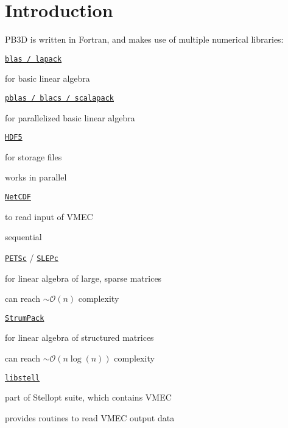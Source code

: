 \hypertarget{page_installation_installation_introduction}{}\section{Introduction}\label{page_installation_installation_introduction}
P\+B3D is written in Fortran, and makes use of multiple numerical libraries\+:
\begin{DoxyItemize}
\item \href{http://www.netlib.org/lapack/}{\tt blas / lapack}
\begin{DoxyItemize}
\item for basic linear algebra
\end{DoxyItemize}
\item \href{http://www.netlib.org/scalapack/}{\tt pblas / blacs / scalapack}
\begin{DoxyItemize}
\item for parallelized basic linear algebra
\end{DoxyItemize}
\item \href{https://www.hdfgroup.org/HDF5/}{\tt H\+D\+F5}
\begin{DoxyItemize}
\item for storage files
\item works in parallel
\end{DoxyItemize}
\item \href{https://www.unidata.ucar.edu/software/netcdf/}{\tt Net\+C\+DF}
\begin{DoxyItemize}
\item to read input of V\+M\+EC
\item sequential
\end{DoxyItemize}
\item \href{https://www.mcs.anl.gov/petsc/}{\tt P\+E\+T\+Sc} / \href{http://slepc.upv.es/}{\tt S\+L\+E\+Pc}
\begin{DoxyItemize}
\item for linear algebra of large, sparse matrices
\item can reach $\sim \mathcal{O} (n)$ complexity
\end{DoxyItemize}
\item \href{http://portal.nersc.gov/project/sparse/strumpack/}{\tt Strum\+Pack}
\begin{DoxyItemize}
\item for linear algebra of structured matrices \cite{Ambikasaran2013}
\item can reach $\sim \mathcal{O} (n \log(n))$ complexity
\end{DoxyItemize}
\item \href{http://vmecwiki.pppl.wikispaces.net/STELLOPT+Compilation}{\tt libstell}
\begin{DoxyItemize}
\item part of Stellopt suite, which contains V\+M\+EC
\item provides routines to read V\+M\+EC output data
\end{DoxyItemize}
\end{DoxyItemize}

